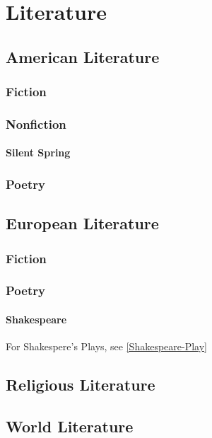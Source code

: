 \chapter{Literature}
	\section{American Literature}
		\subsection{Fiction}
		\subsection{Nonfiction}
			\subsubsection{Silent Spring}
		\subsection{Poetry}

			

		
	\section{European Literature}
		\subsection{Fiction}
		\subsection{Poetry}
		\subsubsection{Shakespeare} \label{Shakespeare-Poetry} For Shakespere's Plays, see \ref{Shakespeare-Play}
	\section{Religious Literature}
	\section{World Literature}